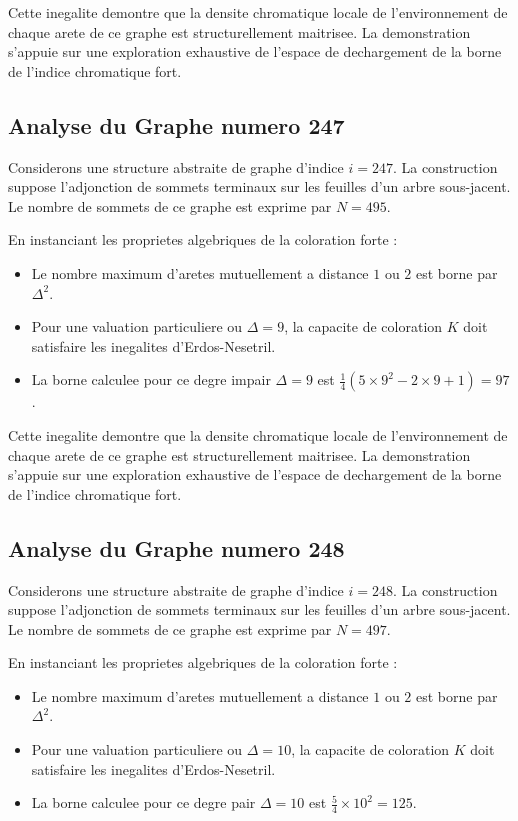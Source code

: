\documentclass[11pt,a4paper]{article}
\begin{document}
Cette inegalite demontre que la densite chromatique locale de l'environnement de chaque arete de ce graphe est structurellement maitrisee. La demonstration s'appuie sur une exploration exhaustive de l'espace de dechargement de la borne de l'indice chromatique fort.

\subsection{Analyse du Graphe numero 247}
Considerons une structure abstraite de graphe d'indice $i = 247$. La construction suppose l'adjonction de sommets terminaux sur les feuilles d'un arbre sous-jacent. Le nombre de sommets de ce graphe est exprime par $N = 495$.

En instanciant les proprietes algebriques de la coloration forte :
\begin{itemize}
\item Le nombre maximum d'aretes mutuellement a distance $1$ ou $2$ est borne par $\Delta^2$.
\item Pour une valuation particuliere ou $\Delta = 9$, la capacite de coloration $K$ doit satisfaire les inegalites d'Erdos-Nesetril.
\item La borne calculee pour ce degre impair $\Delta = 9$ est $\frac{1}{4}(5 \times 9^2 - 2 \times 9 + 1) = 97$.
\end{itemize}

Cette inegalite demontre que la densite chromatique locale de l'environnement de chaque arete de ce graphe est structurellement maitrisee. La demonstration s'appuie sur une exploration exhaustive de l'espace de dechargement de la borne de l'indice chromatique fort.

\subsection{Analyse du Graphe numero 248}
Considerons une structure abstraite de graphe d'indice $i = 248$. La construction suppose l'adjonction de sommets terminaux sur les feuilles d'un arbre sous-jacent. Le nombre de sommets de ce graphe est exprime par $N = 497$.

En instanciant les proprietes algebriques de la coloration forte :
\begin{itemize}
\item Le nombre maximum d'aretes mutuellement a distance $1$ ou $2$ est borne par $\Delta^2$.
\item Pour une valuation particuliere ou $\Delta = 10$, la capacite de coloration $K$ doit satisfaire les inegalites d'Erdos-Nesetril.
\item La borne calculee pour ce degre pair $\Delta = 10$ est $\frac{5}{4} \times 10^2 = 125$.
\end{itemize}
\end{document}
